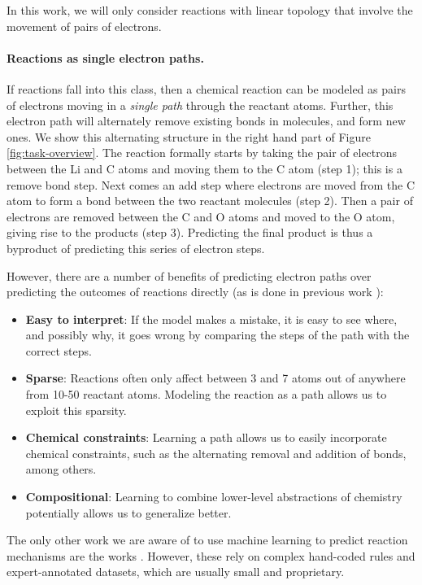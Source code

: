 In this work, we will only consider reactions with linear topology that involve the movement of pairs of electrons.



\vspace{-0.15cm}
\paragraph{Reactions as single electron paths.}
If reactions fall into this class, then a chemical reaction can be modeled as pairs of electrons moving in a \emph{single path} through the reactant atoms. 
Further, this electron path will alternately remove existing bonds in molecules, and form new ones. We show this alternating structure in the right hand part of Figure \ref{fig:task-overview}. 
The reaction formally starts by taking the pair of electrons between the Li and C atoms and moving them to the C atom (step 1); this is a remove bond step. 
Next comes an add step where electrons are moved from the C atom to form a bond between the two reactant molecules (step 2).
Then a pair of electrons are removed between the C and O atoms and moved to the O atom, giving rise to the products (step 3). 
Predicting the final product is thus a byproduct of predicting this series of electron steps.

However, there are a number of benefits of predicting electron paths over predicting the outcomes of reactions directly (as is done in previous work \cite{jin2017predicting,schwaller2017found}):
\begin{itemize}
\item \textbf{Easy to interpret}: If the model makes a mistake, it is easy to see where, and possibly why, it goes wrong by comparing the steps of the path with the correct steps.
\item \textbf{Sparse}: Reactions often only affect between 3 and 7 atoms out of anywhere from 10-50 reactant atoms. Modeling the reaction as a path allows us to exploit this sparsity.
\item \textbf{Chemical constraints}: Learning a path allows us to easily incorporate chemical constraints, such as the alternating removal and addition of bonds, among others.
\item \textbf{Compositional}: Learning to combine lower-level abstractions of chemistry potentially allows us to generalize better.
\end{itemize}
The only other work we are aware of to use machine learning to predict reaction mechanisms are the works \cite{kayala2011learning,kayala2012reactionpredictor}. However,
these rely on complex hand-coded rules and expert-annotated datasets, which are usually small and proprietary.
